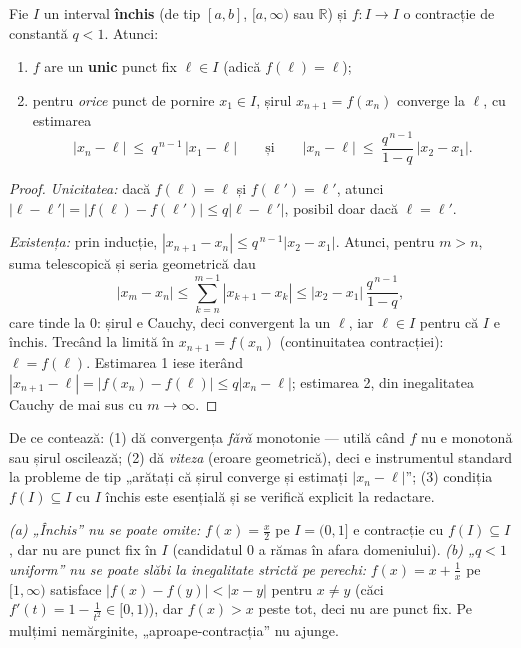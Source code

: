 \begin{teorema}
Fie $I$ un interval \textbf{închis} (de tip $[a,b]$, $[a,\infty)$ sau $\mathbb{R}$) și $f:I\to I$ o contracție de constantă $q<1$. Atunci:
\begin{enumerate}[leftmargin=*, itemsep=1pt]
\item $f$ are un \textbf{unic} punct fix $\ell\in I$ (adică $f(\ell)=\ell$);
\item pentru \emph{orice} punct de pornire $x_1\in I$, șirul $x_{n+1}=f(x_n)$ converge la $\ell$, cu estimarea
\[
|x_n-\ell|\ \le\ q^{\,n-1}\,|x_1-\ell|
\qquad\text{și}\qquad
|x_n-\ell|\ \le\ \frac{q^{\,n-1}}{1-q}\,|x_2-x_1|.
\]
\end{enumerate}
\end{teorema}
\begin{proof}
\emph{Unicitatea:} dacă $f(\ell)=\ell$ și $f(\ell')=\ell'$, atunci $|\ell-\ell'|=|f(\ell)-f(\ell')|\le q|\ell-\ell'|$, posibil doar dacă $\ell=\ell'$.

\emph{Existența:} prin inducție, $|x_{n+1}-x_n|\le q^{\,n-1}|x_2-x_1|$. Atunci, pentru $m>n$, suma telescopică și seria geometrică dau
\[
|x_m-x_n|\le\sum_{k=n}^{m-1}|x_{k+1}-x_k|\le|x_2-x_1|\,\frac{q^{\,n-1}}{1-q},
\]
care tinde la $0$: șirul e Cauchy, deci convergent la un $\ell$, iar $\ell\in I$ pentru că $I$ e închis. Trecând la limită în $x_{n+1}=f(x_n)$ (continuitatea contracției): $\ell=f(\ell)$. Estimarea 1 iese iterând $|x_{n+1}-\ell|=|f(x_n)-f(\ell)|\le q|x_n-\ell|$; estimarea 2, din inegalitatea Cauchy de mai sus cu $m\to\infty$.
\end{proof}

\begin{obs}
De ce contează: (1) dă convergența \emph{fără} monotonie --- utilă când $f$ nu e monotonă sau șirul oscilează; (2) dă \emph{viteza} (eroare geometrică), deci e instrumentul standard la probleme de tip „arătați că șirul converge și estimați $|x_n-\ell|$''; (3) condiția $f(I)\subseteq I$ cu $I$ închis este esențială și se verifică explicit la redactare.
\end{obs}

\begin{obs}
\emph{(a) „Închis'' nu se poate omite:} $f(x)=\frac x2$ pe $I=(0,1]$ e contracție cu $f(I)\subseteq I$, dar nu are punct fix în $I$ (candidatul $0$ a rămas în afara domeniului). \emph{(b) „$q<1$ uniform'' nu se poate slăbi la inegalitate strictă pe perechi:} $f(x)=x+\frac1x$ pe $[1,\infty)$ satisface $|f(x)-f(y)|<|x-y|$ pentru $x\neq y$ (căci $f'(t)=1-\frac1{t^2}\in[0,1)$), dar $f(x)>x$ peste tot, deci nu are punct fix. Pe mulțimi nemărginite, „aproape-contracția'' nu ajunge.
\end{obs}

